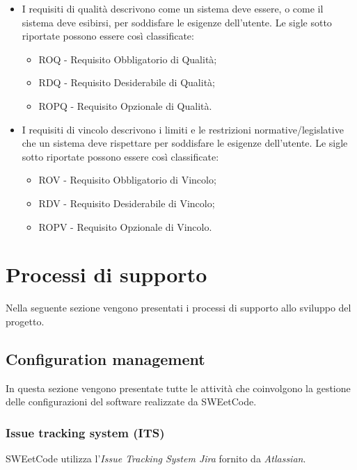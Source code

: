 \documentclass[10pt, a4paper]{article}
\begin{document}
\begin{itemize}
\item I requisiti di qualità descrivono come un sistema deve essere, o
come il sistema deve esibirsi, per soddisfare le esigenze dell'utente.
Le sigle sotto riportate possono essere così classificate:
\begin{itemize}
    \item ROQ - Requisito Obbligatorio di Qualità;
    \item RDQ - Requisito Desiderabile di Qualità;
    \item ROPQ - Requisito Opzionale di Qualità.
\end{itemize}
\end{itemize}
\begin{itemize}
\item I requisiti di vincolo descrivono i limiti e le restrizioni normative/legislative che un sistema
deve rispettare per soddisfare le esigenze dell'utente.
Le sigle sotto riportate possono essere così classificate:
\begin{itemize}
    \item ROV - Requisito Obbligatorio di Vincolo;
    \item RDV - Requisito Desiderabile di Vincolo;
    \item ROPV - Requisito Opzionale di Vincolo. 
\end{itemize}
\end{itemize}

\newpage
\section{Processi di supporto}
Nella seguente sezione vengono presentati i processi di supporto allo sviluppo del progetto.

\subsection{Configuration management}
In questa sezione vengono presentate tutte le attività che coinvolgono la gestione delle configurazioni del software realizzate da SWEetCode.

\subsubsection{Issue tracking system (ITS)} %
SWEetCode utilizza l'\textit{Issue Tracking System Jira} fornito da \textit{Atlassian}.
\end{document}
